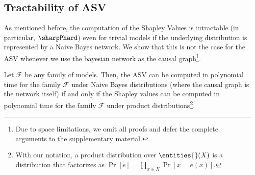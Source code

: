 \subsection{Tractability of ASV}

As mentioned before, the computation of the Shapley Values is intractable (in particular, $\sharpPhard$) even for trivial models
if the underlying distribution is represented by a Naive Bayes network. We show that this is not the case for the ASV whenever we use the bayesian network as the causal graph\footnote{Due to space limitations, we omit all proofs and defer the complete arguments to the supplementary material.}.

\begin{theorem}\label{the:asv_naive_bayes_tractable_clean}
	Let $\mathcal{F}$ be any family of models. Then, the ASV can be computed in polynomial time for the family $\mathcal{F}$ under Naive Bayes distributions (where the causal graph is the network itself) if and only if the Shapley values can be computed in polynomial time for the family $\mathcal{F}$ under product distributions\footnote{With our notation, a product distribution over $\entities{}(X)$ is a distribution that factorizes as $\Pr\left[e\right] = \prod_{x \in X}\Pr\left[ x = e(x) \right]$.}.
\end{theorem}

